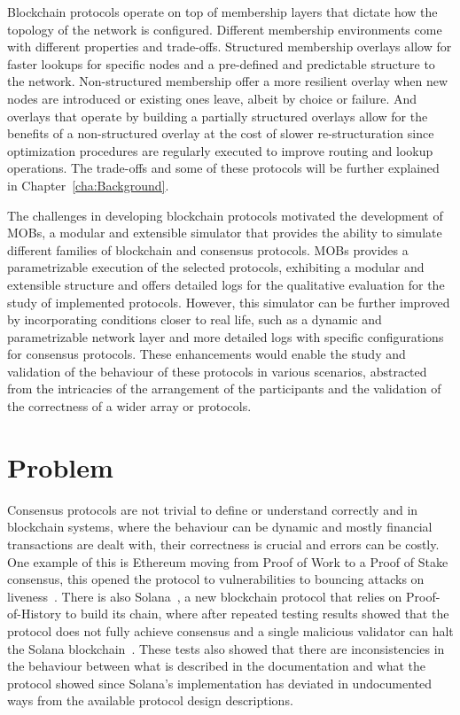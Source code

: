 Blockchain protocols operate on top of membership layers that dictate how the topology of the network is configured.
Different membership environments come with different properties and trade-offs. Structured membership overlays allow for faster lookups for
specific nodes and a pre-defined and predictable structure to the network. Non-structured membership offer a more resilient overlay when
new nodes are introduced or existing ones leave, albeit by choice or failure. And overlays that operate by building a partially structured
overlays allow for the benefits of a non-structured overlay at the cost of slower re-structuration since optimization
procedures are regularly executed to improve routing and lookup operations. The trade-offs and some of these protocols will be further
explained in Chapter~\ref{cha:Background}.

The challenges in developing blockchain protocols motivated the development of MOBs, a modular and extensible simulator that provides
the ability to simulate different families of blockchain and consensus protocols.
MOBs provides a parametrizable execution of the selected protocols, exhibiting a modular and extensible structure and offers detailed logs for the
qualitative evaluation for the study of implemented protocols. However, this simulator can be further improved by incorporating conditions closer
to real life, such as a dynamic and parametrizable network layer and more detailed logs with specific configurations for consensus protocols.
These enhancements would enable the study and validation of the behaviour of these protocols in various scenarios, abstracted from the intricacies
of the arrangement of the participants and the validation of the correctness of a wider array or protocols.

\section{Problem}\label{sub:problem}
Consensus protocols are not trivial to define or understand correctly and in blockchain systems, where the behaviour can be dynamic and mostly 
financial transactions are dealt with, their correctness is crucial and errors can be costly. One example of this is Ethereum moving from 
Proof of Work to a Proof of Stake consensus, this opened the protocol to vulnerabilities to bouncing attacks on liveness~\cite{ethereum_analysis}.
There is also Solana~\cite{solana}, a new blockchain protocol that relies on Proof-of-History to build its chain,
where after repeated testing results showed that the protocol does not fully achieve consensus and
a single malicious validator can halt the Solana blockchain~\cite{solana_halting_problem}. These tests also showed that there are
inconsistencies in the behaviour between what is described in the documentation and what the protocol showed since Solana's implementation
has deviated in undocumented ways from the available protocol design descriptions.

